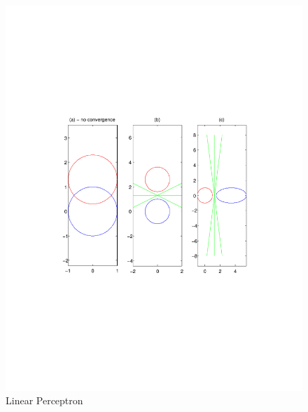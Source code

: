 \documentclass[a4paper,twoside=false,abstract=false,numbers=noenddot,
titlepage=false,headings=small,parskip=half,version=last]{scrartcl}
\theoremstyle{definition}
\theoremstyle{remark}
\begin{document}
\pagebreak
\begin{figure}[t]
    \vspace{-270pt}
    \begin{center}
        \includegraphics[width=1.0\textwidth]{linear_perceptron.pdf}
    \end{center}
    \vspace{-170pt}
    \caption{Linear Perceptron}
    \label{fig:linear}
\end{figure}
\end{document}
